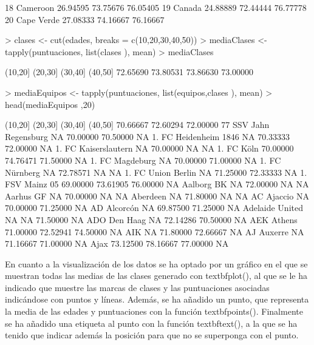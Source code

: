 \documentclass [a4paper] {article}
\begin{document}
\begin{Schunk}
\begin{Soutput}
18           Cameroon 26.94595 73.75676  76.05405
19             Canada 24.88889 72.44444  76.77778
20         Cape Verde 27.08333 74.16667  76.16667
\end{Soutput}
\begin{Sinput}
> clases <- cut(edades, breaks = c(10,20,30,40,50))
> mediaClases <- tapply(puntuaciones, list(clases ), mean)
> mediaClases 
\end{Sinput}
\begin{Soutput}
 (10,20]  (20,30]  (30,40]  (40,50] 
72.65690 73.80531 73.86630 73.00000 
\end{Soutput}
\begin{Sinput}
> mediaEquipos <- tapply(puntuaciones, list(equipos,clases ), mean)
> head(mediaEquipos ,20)
\end{Sinput}
\begin{Soutput}
                       (10,20]  (20,30]  (30,40] (40,50]
                      70.66667 72.60294 72.00000      77
 SSV Jahn Regensburg        NA 70.00000 70.50000      NA
1. FC Heidenheim 1846       NA 70.33333 72.00000      NA
1. FC Kaiserslautern        NA 70.00000       NA      NA
1. FC Köln            70.00000 74.76471 71.50000      NA
1. FC Magdeburg             NA 70.00000 71.00000      NA
1. FC Nürnberg              NA 72.78571       NA      NA
1. FC Union Berlin          NA 71.25000 72.33333      NA
1. FSV Mainz 05       69.00000 73.61905 76.00000      NA
Aalborg BK                  NA 72.00000       NA      NA
Aarhus GF                   NA 70.00000       NA      NA
Aberdeen                    NA 71.80000       NA      NA
AC Ajaccio                  NA 70.00000 71.25000      NA
AD Alcorcón                 NA 69.87500 71.25000      NA
Adelaide United             NA       NA 71.50000      NA
ADO Den Haag                NA 72.14286 70.50000      NA
AEK Athens            71.00000 72.52941 74.50000      NA
AIK                         NA 71.80000 72.66667      NA
AJ Auxerre                  NA 71.16667 71.00000      NA
Ajax                  73.12500 78.16667 77.00000      NA
\end{Soutput}
\end{Schunk}

En cuanto a la visualización de los datos se ha optado por un gráfico en el que se muestran todas las medias de las clases generado con textbf{plot()}, al 
que se le ha indicado que muestre las marcas de clases y las puntuaciones asociadas indicándose con puntos y líneas. Además, se ha añadido un punto, que representa
la media de las edades y puntuaciones con la función textbf{points()}. Finalmente se ha añadido una etiqueta al punto con la función textbf{text()}, a la que se ha tenido
que indicar además la posición para que no se superponga con el punto.
\end{document}
